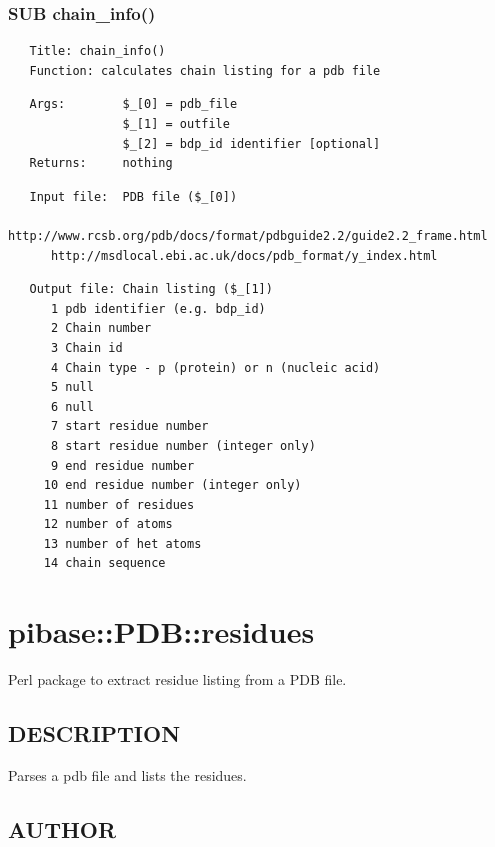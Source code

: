 \documentclass{article}
\begin{document}
\subsubsection*{SUB chain\_info()\label{pibase::PDB::chains_SUB_chain_info_}}
\begin{verbatim}
   Title: chain_info()
   Function: calculates chain listing for a pdb file
\end{verbatim}
\begin{verbatim}
   Args:        $_[0] = pdb_file
                $_[1] = outfile
                $_[2] = bdp_id identifier [optional]
   Returns:     nothing
\end{verbatim}
\begin{verbatim}
   Input file:  PDB file ($_[0]) 
      http://www.rcsb.org/pdb/docs/format/pdbguide2.2/guide2.2_frame.html
      http://msdlocal.ebi.ac.uk/docs/pdb_format/y_index.html
\end{verbatim}
\begin{verbatim}
   Output file: Chain listing ($_[1])
      1 pdb identifier (e.g. bdp_id)
      2 Chain number
      3 Chain id
      4 Chain type - p (protein) or n (nucleic acid)
      5 null
      6 null
      7 start residue number
      8 start residue number (integer only)
      9 end residue number
     10 end residue number (integer only)
     11 number of residues
     12 number of atoms
     13 number of het atoms
     14 chain sequence
\end{verbatim}
\clearpage
\section{pibase::PDB::residues\label{pibase::PDB::residues}}


Perl package to extract residue listing from a PDB file.

\subsection*{DESCRIPTION\label{pibase::PDB::residues_DESCRIPTION}}


Parses a pdb file and lists the residues.

\subsection*{AUTHOR\label{pibase::PDB::residues_AUTHOR}}
\end{document}
